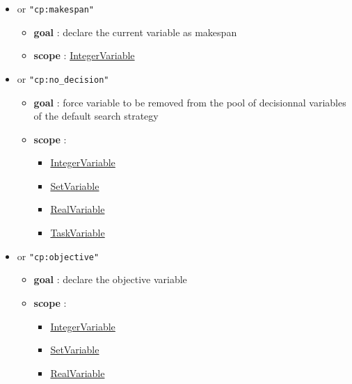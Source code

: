 \begin{itemize}
\begin{itemize}
		\end{itemize}
		\item \label{vmakespan:vmakespanoptions}\hypertarget{vmakespan:vmakespanoptions}{}
		 or \texttt{"cp:makespan"}
		\begin{itemize}
				\item \textbf{goal} : declare the current variable as makespan
				\item \textbf{scope} : \hyperlink{integervariable}{IntegerVariable}
		\end{itemize}		
		\item \label{vnodecision:vnodecisionoptions}\hypertarget{vnodecision:vnodecisionoptions}{}
		 or \texttt{"cp:no\_decision"}
		\begin{itemize}
				\item \textbf{goal} : force variable to be removed from the pool of decisionnal variables of the default search strategy
				\item \textbf{scope} : 
					\begin{itemize} 
						\item \hyperlink{integervariable}{IntegerVariable}
						\item \hyperlink{setvariable}{SetVariable}
						\item \hyperlink{realvariable}{RealVariable}
						\item \hyperlink{taskvariable}{TaskVariable}
					\end{itemize}				
		\end{itemize}			
		\item \label{vobjective:vobjectiveoptions}\hypertarget{vobjective:vobjectiveoptions}{}
		 or \texttt{"cp:objective"}
		\begin{itemize}
				\item \textbf{goal} : declare the objective variable
				\item \textbf{scope} : 
					\begin{itemize} 
						\item \hyperlink{integervariable}{IntegerVariable}
						\item \hyperlink{setvariable}{SetVariable}
						\item \hyperlink{realvariable}{RealVariable}
					\end{itemize}				
		\end{itemize}
	\end{itemize}		
	

